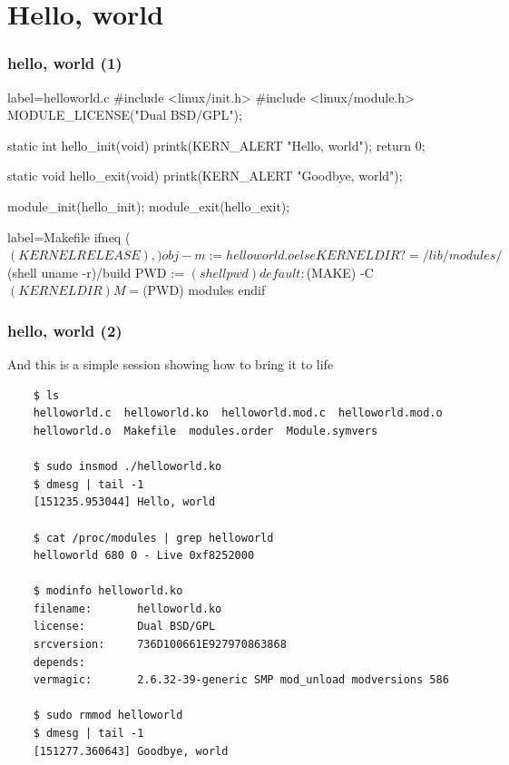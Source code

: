 \documentclass[xcolor=dvipsnames,compress]{beamer}
\newcommand\Fontvi{\fontsize{6}{7.2}\selectfont}
\begin{document}
\section[hello]{Hello, world}
\begin{frame}[fragile]
\frametitle{hello, world (1)}
    \begin{ccode*}{label=helloworld.c} 
    #include <linux/init.h>
    #include <linux/module.h>
    MODULE_LICENSE("Dual BSD/GPL");

    static int hello_init(void)
    {
        printk(KERN_ALERT "Hello, world\n");
        return 0;
    }

    static void hello_exit(void)
    {
        printk(KERN_ALERT "Goodbye, world\n");
    }

    module_init(hello_init);
    module_exit(hello_exit);
    \end{ccode*}
    \begin{makecode*}{label=Makefile}
    ifneq ($(KERNELRELEASE),)
        obj-m := helloworld.o
    else
        KERNELDIR ?= /lib/modules/$(shell uname -r)/build
        PWD := $(shell pwd)
    default:
        $(MAKE) -C $(KERNELDIR) M=$(PWD) modules
    endif
    \end{makecode*}
\end{frame}
\begin{frame}[fragile]
\frametitle{hello, world (2)}
    And this is a simple session showing how to bring it to life
    \Fontvi
    \begin{verbatim}
    $ ls
    helloworld.c  helloworld.ko  helloworld.mod.c  helloworld.mod.o  
    helloworld.o  Makefile  modules.order  Module.symvers

    $ sudo insmod ./helloworld.ko
    $ dmesg | tail -1
    [151235.953044] Hello, world

    $ cat /proc/modules | grep helloworld
    helloworld 680 0 - Live 0xf8252000

    $ modinfo helloworld.ko
    filename:       helloworld.ko
    license:        Dual BSD/GPL
    srcversion:     736D100661E927970863868
    depends:        
    vermagic:       2.6.32-39-generic SMP mod_unload modversions 586 

    $ sudo rmmod helloworld 
    $ dmesg | tail -1
    [151277.360643] Goodbye, world
    \end{verbatim}
\end{frame}
\end{document}
